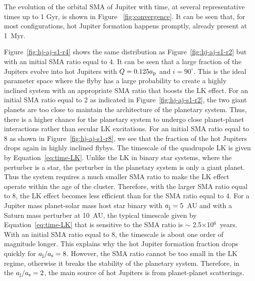 \documentclass[twocolumn]{aastex63}
\newcommand*\fgr[1]{Figure~\ref{#1}}
\newcommand*\eqn[1]{Equation~\ref{#1}}
\begin{document}
The evolution of the orbital SMA of Jupiter with time, at several representative times up to 1 Gyr, is shown in Figure~ \ref{fig:convergence}. It can be seen that, for most configurations, hot Jupiter formation happens promptly, already present at 1~Myr.

\fgr{fig:hj-aj-s1-r4} shows the same distribution as \fgr{fig:hj-aj-s1-r2} but with an initial SMA ratio equal to 4. It can be seen that a large fraction of the Jupiters evolve into hot Jupiters with $Q=0.125a_{\rm p}$ and $i=90^\circ$. This is the ideal parameter space where the flyby has a large probability to create a highly inclined system with an appropriate SMA ratio that boosts the LK effect. For an initial SMA ratio equal to 2 as indicated  in \fgr{fig:hj-aj-s1-r2}, the two giant planets are too close to maintain the architecture of the planetary system. Thus, there is a higher chance for the planetary system to undergo close planet-planet interactions rather than secular LK excitations. For an initial SMA ratio equal to 8 as shown in \fgr{fig:hj-aj-s1-r8}, we see that the fraction of the hot Jupiters drops again in highly inclined flybys. The timescale of the quadrupole LK is given by \eqn{eq:time-LK}. Unlike the LK in binary star systems, where the perturber is a star, the perturber in the planetary system is only a giant planet. Thus the system requires a much smaller SMA ratio to make the LK effect operate within the age of the cluster. Therefore, with the larger SMA ratio equal to 8, the LK effect becomes less efficient than for the SMA ratio equal to 4. For a Jupiter mass planet-solar mass host star binary with $a_{\rm j}=5$~AU and with a Saturn mass perturber at 10~AU, the typical  timescale given by \eqn{eq:time-LK} that is sensitive to the SMA ratio is $\sim$ 2.5$\times$10$^6$~years. With an initial SMA ratio equal to 8, the timescale is about one order of magnitude longer. This explains why the hot Jupiter formation fraction drops quickly for $a_{\rm j}/a_{\rm s}=8$. However, the SMA ratio cannot be too small in the LK regime, otherwise it breaks the stability of the planetary system. Therefore, in the  $a_{\rm j}/a_{\rm s}=2$, the main source of hot Jupiters is from planet-planet scatterings.
\end{document}
